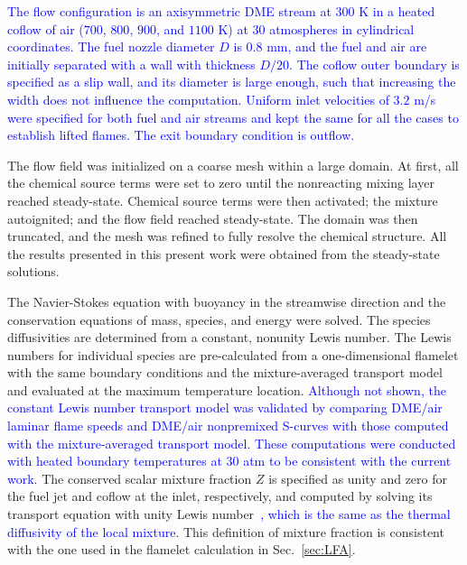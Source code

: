 \documentclass[review,3p,times]{elsarticle}
\begin{document}
\textcolor{blue}{The flow configuration is an axisymmetric DME stream at $300$ K in a heated coflow of air ($700$, $800$, $900$, and $1100$ K) at $30$ atmospheres in cylindrical coordinates.  The fuel nozzle diameter $D$ is $0.8$ mm, and the fuel and air are initially separated with a wall with thickness $D/20$.  The coflow outer boundary is specified as a slip wall, and its diameter is large enough, such that increasing the width does not influence the computation.  Uniform inlet velocities of $3.2$ m/s were specified for both fuel and air streams and kept the same for all the cases to establish lifted flames.  The exit boundary condition is outflow.}


The flow field was initialized on a coarse mesh within a large domain.  At first, all the chemical source terms were set to zero until the nonreacting mixing layer reached steady-state.  Chemical source terms were then activated; the mixture autoignited; and the flow field reached steady-state.  The domain was then truncated, and the mesh was refined to fully resolve the chemical structure.  All the results presented in this present work were obtained from the steady-state solutions.  

The Navier-Stokes equation with buoyancy in the streamwise direction and the conservation equations of mass, species, and energy were solved.  The species diffusivities are determined from a constant, nonunity Lewis number.  The Lewis numbers for individual species are pre-calculated from a one-dimensional flamelet with the same boundary conditions and the mixture-averaged transport model and evaluated at the maximum temperature location.  \textcolor{blue}{Although not shown, the constant Lewis number transport model was validated by comparing DME/air laminar flame speeds and DME/air nonpremixed S-curves with those computed with the mixture-averaged transport model.  These computations were conducted with heated boundary temperatures at $30$ atm to be consistent with the current work.}  The conserved scalar mixture fraction $Z$ is specified as unity and zero for the fuel jet and coflow at the inlet, respectively, and computed by solving its transport equation with unity Lewis number~\cite{pitsch98b}\textcolor{blue}{, which is the same as the thermal diffusivity of the local mixture}.  This definition of mixture fraction is consistent with the one used in the flamelet calculation in Sec.~\ref{sec:LFA}.
\end{document}
